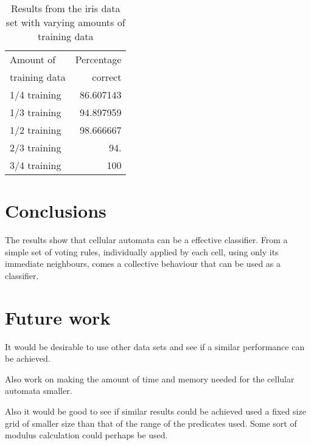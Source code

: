 \documentclass[11pt]{article}
\begin{document}
\begin{table}[htb]
\caption{Results from the iris data set with varying amounts of training data} 
\begin{center}
\begin{tabular}{lr}
\hline
 Amount of      &  Percentage  \\
 training data  &     correct  \\
\hline
 1/4 training   &   86.607143  \\
 1/3 training   &   94.897959  \\
 1/2 training   &   98.666667  \\
 2/3 training   &         94.  \\
 3/4 training   &         100  \\
\hline
\end{tabular}
\end{center}
\end{table}
\section{Conclusions}
\label{sec-6}

  The results show that cellular automata can be a effective
  classifier.  From a simple set of voting rules, individually applied
  by each cell, using only its immediate neighbours, comes a
  collective behaviour that can be used as a classifier.
\section{Future work}
\label{sec-7}

  It would be desirable to use other data sets and see if a similar
  performance can be achieved.

  Also work on making the amount of time and memory needed for the
  cellular automata smaller.  

  Also it would be good to see if similar results could be achieved
  used a fixed size grid of smaller size than that of the range of the
  predicates used.  Some sort of modulus calculation could perhaps be
  used.




\end{document}
